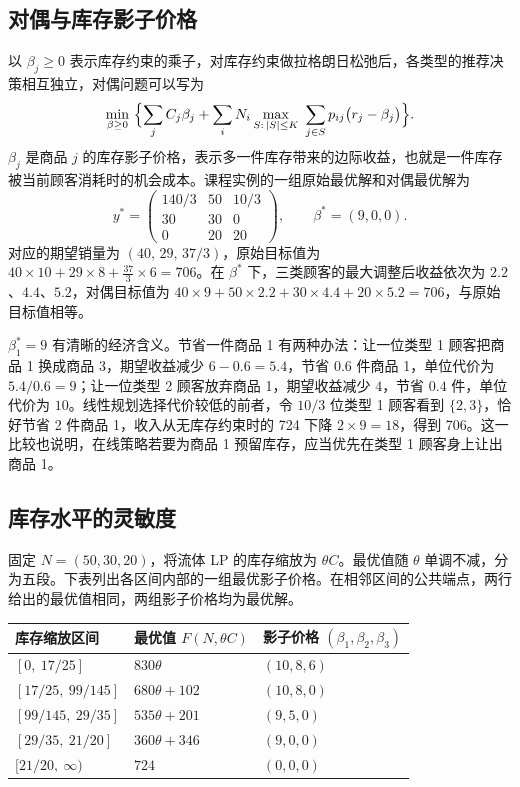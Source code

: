 \subsection{对偶与库存影子价格}
以 $\beta_j\ge0$ 表示库存约束的乘子，对库存约束做拉格朗日松弛后，各类型的推荐决策相互独立，对偶问题可以写为
\begin{equation}
\min_{\beta\ge0}\ \Bigl\{\sum_{j}C_j\beta_j+\sum_{i}N_i\max_{S:\,|S|\le K}\ \sum_{j\in S}p_{ij}\bigl(r_j-\beta_j\bigr)\Bigr\}.
\label{eq:dual}
\end{equation}
$\beta_j$ 是商品 $j$ 的库存影子价格，表示多一件库存带来的边际收益，也就是一件库存被当前顾客消耗时的机会成本。课程实例的一组原始最优解和对偶最优解为
\begin{equation}
y^{*}=\begin{pmatrix}140/3&50&10/3\\30&30&0\\0&20&20\end{pmatrix},\qquad \beta^{*}=(9,0,0).
\label{eq:lpsolution}
\end{equation}
对应的期望销量为 $(40,\,29,\,37/3)$，原始目标值为 $40\times10+29\times8+\tfrac{37}{3}\times6=706$。在 $\beta^{*}$ 下，三类顾客的最大调整后收益依次为 $2.2$、$4.4$、$5.2$，对偶目标值为 $40\times9+50\times2.2+30\times4.4+20\times5.2=706$，与原始目标值相等。

$\beta_1^{*}=9$ 有清晰的经济含义。节省一件商品 1 有两种办法：让一位类型 1 顾客把商品 1 换成商品 3，期望收益减少 $6-0.6=5.4$，节省 $0.6$ 件商品 1，单位代价为 $5.4/0.6=9$；让一位类型 2 顾客放弃商品 1，期望收益减少 $4$，节省 $0.4$ 件，单位代价为 $10$。线性规划选择代价较低的前者，令 $10/3$ 位类型 1 顾客看到 $\{2,3\}$，恰好节省 2 件商品 1，收入从无库存约束时的 724 下降 $2\times9=18$，得到 706。这一比较也说明，在线策略若要为商品 1 预留库存，应当优先在类型 1 顾客身上让出商品 1。

\subsection{库存水平的灵敏度}
固定 $N=(50,30,20)$，将流体 LP 的库存缩放为 $\theta C$。最优值随 $\theta$ 单调不减，分为五段。下表列出各区间内部的一组最优影子价格。在相邻区间的公共端点，两行给出的最优值相同，两组影子价格均为最优解。
\begin{center}
\begin{tabular}{@{}lll@{}}
\toprule
库存缩放区间 & 最优值 $F(N,\theta C)$ & 影子价格 $(\beta_1,\beta_2,\beta_3)$\\
\midrule
$[0,\ 17/25]$          & $830\theta$      & $(10,8,6)$\\
$[17/25,\ 99/145]$     & $680\theta+102$  & $(10,8,0)$\\
$[99/145,\ 29/35]$     & $535\theta+201$  & $(9,5,0)$\\
$[29/35,\ 21/20]$      & $360\theta+346$  & $(9,0,0)$\\
$[21/20,\ \infty)$      & $724$            & $(0,0,0)$\\
\bottomrule
\end{tabular}
\end{center}

